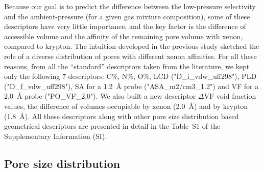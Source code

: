 \documentclass[main]{subfiles}
\begin{document}
Because our goal is to predict the difference between the low-pressure selectivity and the ambient-pressure (for a given gas mixture composition), some of these descriptors have very little importance, and the key factor is the difference of accessible volume and the affinity of the remaining pore volume with xenon, compared to krypton. The intuition developed in the previous study sketched the role of a diverse distribution of pores with different xenon affinities.\cite{Ren_2021} For all these reasons, from all the ``standard'' descriptors taken from the literature, we kept only the following 7 descriptors: C\%, N\%, O\%, LCD ("D\_i\_vdw\_uff298"), PLD ("D\_f\_vdw\_uff298"), SA for a \SI{1.2}{\angstrom} probe ("ASA\_m2/cm3\_1.2") and VF for a \SI{2.0}{\angstrom} probe ("PO\_VF\_2.0"). We also built a new descriptor $\Delta \text{VF}$ void fraction values, the difference of volumes occupiable by xenon (\SI{2.0}{\angstrom}) and by krypton (\SI{1.8}{\angstrom}). All these descriptors along with other pore size distribution based geometrical descriptors are presented in detail in the Table~S1 of the Supplementary Information (SI).

\subsection{Pore size distribution}
\end{document}
